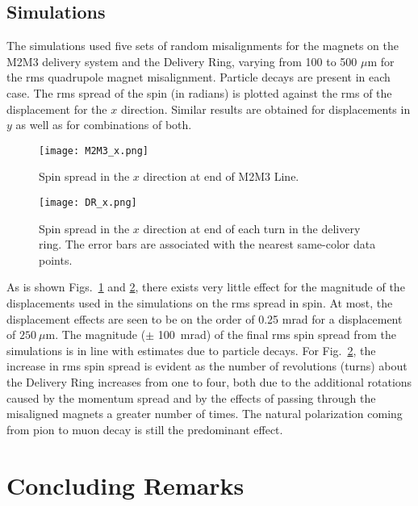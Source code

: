 \documentclass[12pt]{article}
\begin{document}
\subsection{Simulations}
The simulations used five sets of random misalignments for the magnets on the M2M3 delivery system and the Delivery Ring, varying from 100 to 500 $\mu$m for the rms quadrupole magnet misalignment.  Particle decays are present in each case.  The rms spread of the spin (in radians) is plotted against the rms of the displacement for the $x$ direction.  Similar results are obtained for displacements in $y$ as well as for combinations of both.  

\begin{figure}
\centering
\texttt{[image: M2M3\_x.png]} %
\caption[M2M3 Polarization in X direction]{Spin spread in the $x$ direction at end of M2M3 Line.}
\label{fig:M2M3_X}
\end{figure}
\begin{figure}
\centering
\texttt{[image: DR\_x.png]} %
\caption[DR Polarization in X direction]{Spin spread in the $x$ direction at end of each turn in the delivery ring. The error bars are associated with the nearest same-color data points.}
\label{fig:DR_X}
\end{figure}

As is shown Figs.~\ref{fig:M2M3_X} and \ref{fig:DR_X}, there exists very little effect for the magnitude of the displacements used in the simulations on the rms spread in spin. 
At most, the displacement effects are seen to be on the order of 0.25 mrad for a displacement of $250~\mu$m.   The magnitude ($\pm$ 100~mrad) of the final rms spin spread from the simulations is in line with estimates due to particle decays.   For Fig.~\ref{fig:DR_X}, the increase in rms spin spread is evident as the number of revolutions (turns) about the Delivery Ring increases from one to four, both due to the additional rotations caused by the momentum spread and by the effects of passing through the misaligned magnets a greater number of times.  The natural polarization coming from pion to muon decay is still the predominant effect.


\section{Concluding Remarks}
\end{document}
